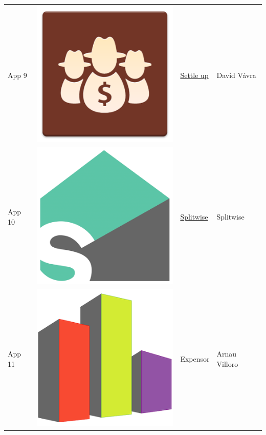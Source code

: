 \begin{tabular}{ | l | c | l | l | }
App 9 & \includegraphics[scale=0.05]{A10_icon.png} & \href{https://play.google.com/store/apps/details?id=cz.destil.settleup}{Settle up} & David Vávra \\

App 10 & \includegraphics[scale=0.05]{A11_icon.png} & \href{https://play.google.com/store/apps/details?id=com.Splitwise.SplitwiseMobile}{Splitwise} & Splitwise \\

App 11 & \includegraphics[scale=0.2]{A12_icon.png} & Expensor & Arnau Villoro \\
\hline
\end{tabular}